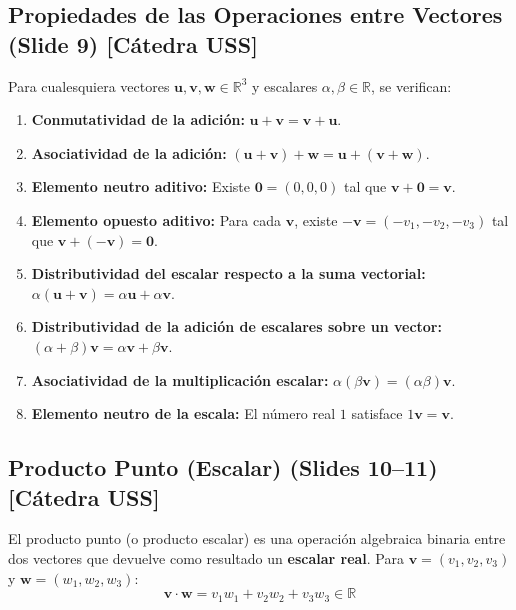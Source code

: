 \documentclass[10pt,letterpaper]{article}
\newcommand{\vu}{\mathbf{u}}
\newcommand{\vv}{\mathbf{v}}
\newcommand{\vw}{\mathbf{w}}
\begin{document}
\subsection{Propiedades de las Operaciones entre Vectores (Slide 9) [Cátedra USS]}

\begin{cajaTeorema}
Para cualesquiera vectores $\vu, \vv, \vw \in \mathbb{R}^3$ y escalares $\alpha, \beta \in \mathbb{R}$, se verifican:
\begin{enumerate}
    \item \textbf{Conmutatividad de la adición:} $\vu + \vv = \vv + \vu$.
    \item \textbf{Asociatividad de la adición:} $(\vu + \vv) + \vw = \vu + (\vv + \vw)$.
    \item \textbf{Elemento neutro aditivo:} Existe $\mathbf{0} = (0,0,0)$ tal que $\vv + \mathbf{0} = \vv$.
    \item \textbf{Elemento opuesto aditivo:} Para cada $\vv$, existe $-\vv = (-v_1, -v_2, -v_3)$ tal que $\vv + (-\vv) = \mathbf{0}$.
    \item \textbf{Distributividad del escalar respecto a la suma vectorial:} $\alpha(\vu + \vv) = \alpha\vu + \alpha\vv$.
    \item \textbf{Distributividad de la adición de escalares sobre un vector:} $(\alpha + \beta)\vv = \alpha\vv + \beta\vv$.
    \item \textbf{Asociatividad de la multiplicación escalar:} $\alpha(\beta\vv) = (\alpha\beta)\vv$.
    \item \textbf{Elemento neutro de la escala:} El número real $1$ satisface $1\vv = \vv$.
\end{enumerate}
\end{cajaTeorema}

\subsection{Producto Punto (Escalar) (Slides 10--11) [Cátedra USS]}

\begin{cajaDefinicion}
El producto punto (o producto escalar) es una operación algebraica binaria entre dos vectores que devuelve como resultado un \textbf{escalar real}. Para $\vv = (v_1, v_2, v_3)$ y $\vw = (w_1, w_2, w_3)$:
\[
\vv \cdot \vw = v_1 w_1 + v_2 w_2 + v_3 w_3 \in \mathbb{R}
\]
\end{cajaDefinicion}
\end{document}
